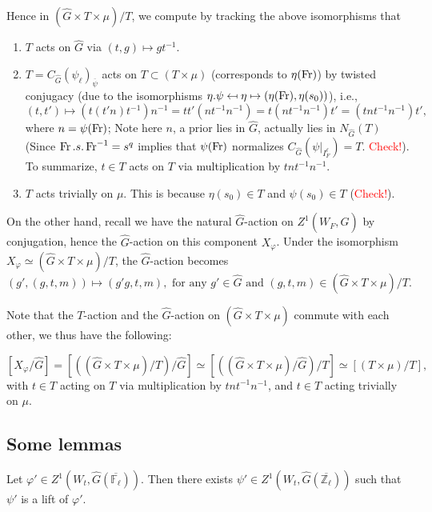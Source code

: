 Hence in $(\hat{G} \times T \times \mu)/T$, we compute by tracking the above isomorphisms that 
\begin{enumerate}
	\item $T$ acts on $\hat{G}$ via $(t, g) \mapsto gt^{-1}$.
	\item $T=C_{\hat{G}}(\psi_{\ell})_{\overline{\psi}}$ acts on $T \subset (T \times \mu)$ (corresponds to $\eta(\operatorname{Fr})$) by twisted conjugacy (due to the isomorphisms $\eta.\psi \mapsfrom \eta \mapsto (\eta(\operatorname{Fr}), \eta(s_0))$), i.e., 
	$$(t, t') \mapsto \left(t(t'n)t^{-1}\right)n^{-1}=tt'(nt^{-1}n^{-1})=t(nt^{-1}n^{-1})t'=(tnt^{-1}n^{-1})t',$$
	where $n=\psi(\operatorname{Fr})$; Note here $n$, a prior lies in $\hat{G}$, actually lies in $N_{\hat{G}}(T)$ (Since $\operatorname{Fr}.s.\operatorname{Fr}^{-1}=s^q$ implies that $\psi(\operatorname{Fr})$ normalizes $C_{\hat{G}}(\psi|_{I_F^{\ell}})=T$. \textcolor{red}{Check!}). To summarize, $t \in T$ acts on $T$ via multiplication by $tnt^{-1}n^{-1}$.
	\item $T$ acts trivially on $\mu$. This is because $\eta(s_0) \in T$ and $\psi(s_0) \in T$ (\textcolor{red}{Check!}).
\end{enumerate}

On the other hand, recall we have the natural $\hat{G}$-action on $Z^1(W_F, \hat{G})$ by conjugation, hence the $\hat{G}$-action on this component $X_{\varphi}$. Under the isomorphism $X_{\varphi} \simeq (\hat{G} \times T \times \mu)/T$, the $\hat{G}$-action becomes
$$(g', (g, t, m)) \mapsto  (g'g, t, m), \text{ for any } g' \in \hat{G} \text{ and } (g, t, m) \in (\hat{G} \times T \times \mu)/T.$$

Note that the $T$-action and the $\hat{G}$-action on $(\hat{G} \times T \times \mu)$ commute with each other, we thus have the following:

\begin{proposition}\label{T times mu/T}
	$$[X_{\varphi}/\hat{G}]=\left[\left((\hat{G} \times T \times \mu)/T\right)/\hat{G}\right] \simeq \left[\left((\hat{G} \times T \times \mu)/\hat{G}\right)/T\right] \simeq [(T \times \mu)/T],$$ 
	with $t \in T$ acting on $T$ via multiplication by $tnt^{-1}n^{-1}$, and $t \in T$ acting trivially on $\mu$. 
\end{proposition}

\subsection{Some lemmas}

\begin{lemma}\label{Lem generalizing}
	Let $\varphi' \in Z^1(W_t, \hat{G}(\overline{\mathbb{F}_{\ell}}))$. Then there exists $\psi' \in Z^1(W_t, \hat{G}(\overline{\mathbb{Z}_{\ell}}))$ such that $\psi'$ is a lift of $\varphi'$.
\end{lemma}

